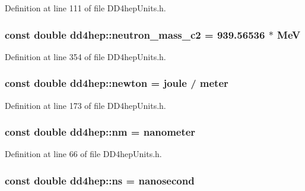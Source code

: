 Definition at line 111 of file DD4hepUnits.h.\hypertarget{namespacedd4hep_a9e1f91639c11f55a3550815f9e0fca7d}{
\subsubsection[{neutron\_\-mass\_\-c2}]{\setlength{\rightskip}{0pt plus 5cm}const double {\bf dd4hep::neutron\_\-mass\_\-c2} = 939.56536 $\ast$ {\bf MeV}}}
\label{namespacedd4hep_a9e1f91639c11f55a3550815f9e0fca7d}


Definition at line 354 of file DD4hepUnits.h.\hypertarget{namespacedd4hep_a07c189d8b327db9b4ae12f3def589851}{
\subsubsection[{newton}]{\setlength{\rightskip}{0pt plus 5cm}const double {\bf dd4hep::newton} = {\bf joule} / {\bf meter}}}
\label{namespacedd4hep_a07c189d8b327db9b4ae12f3def589851}


Definition at line 173 of file DD4hepUnits.h.\hypertarget{namespacedd4hep_a4d2ce915ee05dfc3b7b1c503561e87f1}{
\subsubsection[{nm}]{\setlength{\rightskip}{0pt plus 5cm}const double {\bf dd4hep::nm} = {\bf nanometer}}}
\label{namespacedd4hep_a4d2ce915ee05dfc3b7b1c503561e87f1}


Definition at line 66 of file DD4hepUnits.h.\hypertarget{namespacedd4hep_af8ce9b988119cb2c9b6b7397dbb34e97}{
\subsubsection[{ns}]{\setlength{\rightskip}{0pt plus 5cm}const double {\bf dd4hep::ns} = {\bf nanosecond}}}
\label{namespacedd4hep_af8ce9b988119cb2c9b6b7397dbb34e97}


